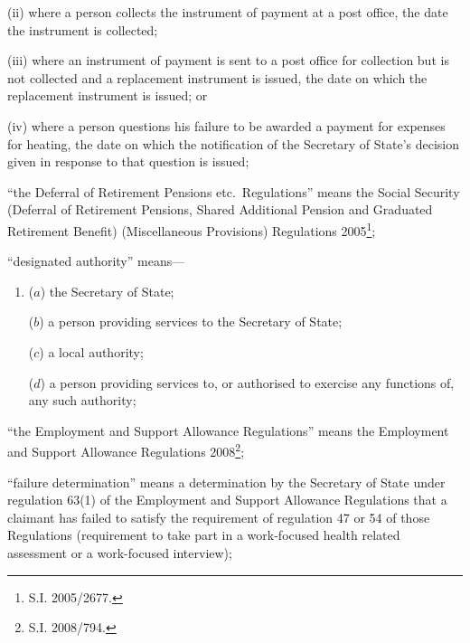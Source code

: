 \documentclass[12pt,a4paper]{article}
\begin{document}
\begin{enumerate}
\begin{enumerate}
\begin{enumerate}
(ii) where a person collects the instrument of payment at a post office, the date the instrument is collected;

(iii) where an instrument of payment is sent to a post office for collection but is not collected and a replacement instrument is issued, the date on which the replacement instrument is issued; or

(iv) where a person questions his failure to be awarded a payment for expenses for heating, the date on which the notification of the Secretary of State’s decision given in response to that question is issued;
\end{enumerate}
\end{enumerate}

“the Deferral of Retirement Pensions etc.\ Regulations” means the Social Security (Deferral of Retirement Pensions, Shared Additional Pension and Graduated Retirement Benefit) (Miscellaneous Provisions) Regulations 2005\footnote{S.I. 2005/2677.};


“designated authority” means—
\begin{enumerate}\item[]
    ($a$)     the Secretary of State;

    ($b$) 
    a person providing services to the Secretary of State;

    ($c$) 
    a local authority;

    ($d$) 
    a person providing services to, or authorised to exercise any functions of, any such authority;
\end{enumerate}

“the Employment and Support Allowance Regulations” means the Employment and Support Allowance Regulations 2008\footnote{S.I. 2008/794.};

“failure determination” means a determination by the Secretary of State under regulation 63(1) of the Employment and Support Allowance Regulations that a claimant has failed to satisfy the requirement of regulation 47 or 54 of those Regulations (requirement to take part in a work-focused health related assessment or a work-focused interview);


\end{enumerate}
\end{document}
